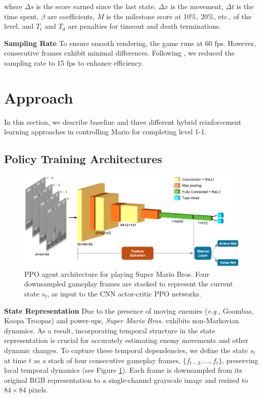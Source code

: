 \documentclass{article}
\begin{document}
where $\Delta s$ is the score earned since the last state, $\Delta x$ is the 
movement, $\Delta t$ is the time spent, $\beta$ are coefficients, $M$ is the 
milestone score at 10\%, 20\%, etc., of the level, and $T_t$ and $T_d$ are 
penalties for timeout and death terminations.

\textbf{Sampling Rate}
To ensure smooth rendering, the game runs at 60 fps. However, consecutive 
frames exhibit minimal differences. Following \cite{feng2024mario}, 
we reduced the sampling rate to 15 fps to enhance efficiency.


\section{Approach}
In this section, we describe baseline and three different hybrid reinforcement 
learning approaches in controlling Mario for completing level 1-1.

\subsection{Policy Training Architectures}

\begin{figure}[htbp]
      \centering
      \includegraphics[width=\columnwidth]{figures/architecture.png}
      \caption{PPO agent architecture for playing Super Mario Bros.
      Four downsampled gameplay frames are stacked 
      to represent the current state $s_t$, as input to the CNN actor-critic PPO
      networks.}
      \label{fig:arch}
\end{figure}

\textbf{State Representation}
Due to the presence of moving enemies (\textit{e.g.}, Goombas, Koopa Troopas) 
and power-ups, \textit{Super Mario Bros.} exhibits non-Markovian dynamics.
As a result, incorporating temporal structure in the state representation is 
crucial for accurately estimating enemy movements and other dynamic changes. 
To capture these temporal dependencies, we define the state $s_t$ at time $t$ 
as a stack of four consecutive gameplay frames, $\{ f_{t-3}, \dots, f_t \}$, 
preserving local temporal dynamics (see Figure \ref{fig:arch}). 
Each frame is downsampled from its original RGB representation to a 
single-channel grayscale image and resized to $84 \times 84$ pixels.
\end{document}
